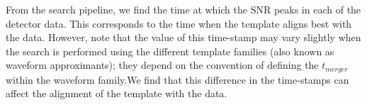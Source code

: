 
From the search pipeline, we find the time at which the SNR peaks in each of the detector data. This corresponds to the time when the template aligns best with the data. However, note that the  value of this time-stamp may vary slightly when the search is performed using the different template families (also known as waveform approximants); they depend on the convention of defining the $t_{merger}$ within the waveform family.We find that this difference in the time-stamps can affect the alignment of the template with the data. 


